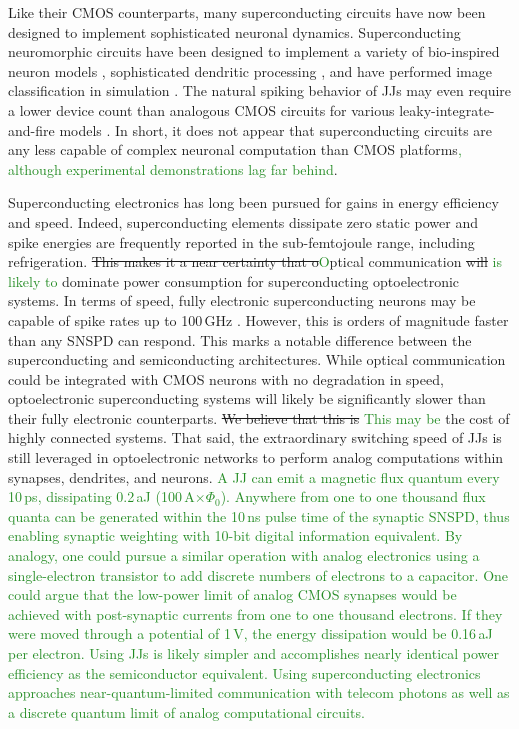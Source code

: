 \documentclass[twocolumn]{article}
\begin{document}
Like their CMOS counterparts, many superconducting circuits have now been designed to implement sophisticated neuronal dynamics. Superconducting neuromorphic circuits have been designed to implement a variety of bio-inspired neuron models \cite{crotty2010josephson, toomey2019design, schneider2018tutorial}, sophisticated dendritic processing \cite{shainline2019fluxonic}, and have performed image classification in simulation \cite{schneider2017energy}. The natural spiking behavior of JJs may even require a lower device count than analogous CMOS circuits for various leaky-integrate-and-fire models \cite{crotty2010josephson}. In short, it does not appear that superconducting circuits are any less capable of complex neuronal computation than CMOS platforms\textcolor{ForestGreen}{, although experimental demonstrations lag far behind}.

Superconducting electronics has long been pursued for gains in energy efficiency and speed. Indeed, superconducting elements dissipate zero static power and spike energies are frequently reported in the sub-femtojoule range, including refrigeration. \sout{This makes it a near certainty that o}\textcolor{ForestGreen}{O}ptical communication \sout{will} \textcolor{ForestGreen}{is likely to} dominate power consumption for superconducting optoelectronic systems. In terms of speed, fully electronic superconducting neurons may be capable of spike rates up to 100\,GHz \cite{schneider2018tutorial, schneider2017energy}. However, this is orders of magnitude faster than any SNSPD can respond. This marks a notable difference between the superconducting and semiconducting architectures. While optical communication could be integrated with CMOS neurons with no degradation in speed, optoelectronic superconducting systems will likely be significantly slower than their fully electronic counterparts. \sout{We believe that this is} \textcolor{ForestGreen}{This may be} the cost of highly connected systems. That said, the extraordinary switching speed of JJs is still leveraged in optoelectronic networks to perform analog computations within synapses, dendrites, and neurons. \textcolor{ForestGreen}{A JJ can emit a magnetic flux quantum every 10\,ps, dissipating 0.2\,aJ (100\,\textmu A$\times \Phi_0$). Anywhere from one to one thousand flux quanta can be generated within the 10\,ns pulse time of the synaptic SNSPD, thus enabling synaptic weighting with 10-bit digital information equivalent. By analogy, one could pursue a similar operation with analog electronics using a single-electron transistor to add discrete numbers of electrons to a capacitor. One could argue that the low-power limit of analog CMOS synapses would be achieved with post-synaptic currents from one to one thousand electrons. If they were moved through a potential of 1\,V, the energy dissipation would be 0.16\,aJ per electron. Using JJs is likely simpler and accomplishes nearly identical power efficiency as the semiconductor equivalent. Using superconducting electronics approaches near-quantum-limited communication with telecom photons as well as a discrete quantum limit of analog computational circuits.}
\end{document}
